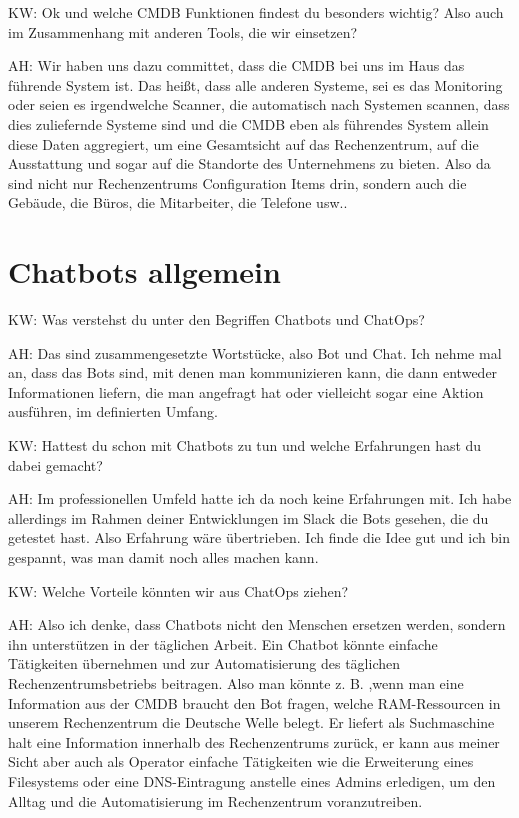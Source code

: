 \begin{list}{X:}{\setlength{\labelsep}{5mm}}
\item [KW:] Ok und welche CMDB Funktionen findest du besonders wichtig? Also auch im Zusammenhang mit anderen Tools, die wir einsetzen? 
\item [AH:] Wir haben uns dazu committet, dass die CMDB bei uns im Haus das führende System ist. Das heißt, dass alle anderen Systeme, sei es das Monitoring oder seien es irgendwelche Scanner, die automatisch nach Systemen scannen, dass dies zuliefernde Systeme sind und die CMDB eben als führendes System allein diese Daten aggregiert, um eine Gesamtsicht auf das Rechenzentrum, auf die Ausstattung und sogar auf die Standorte des Unternehmens zu bieten. Also da sind nicht nur Rechenzentrums Configuration Items drin, sondern auch die Gebäude, die Büros, die Mitarbeiter, die Telefone usw..
\end{list}

\section*{Chatbots allgemein}

\begin{list}{X:}{\setlength{\labelsep}{5mm}}
\item [KW:] Was verstehst du unter den Begriffen Chatbots und ChatOps?
\item [AH:] Das sind zusammengesetzte Wortstücke, also Bot und Chat. Ich nehme mal an, dass das Bots sind, mit denen man kommunizieren kann, die dann entweder Informationen liefern, die man angefragt hat oder vielleicht sogar eine Aktion ausführen, im definierten Umfang. 
\item [KW:] Hattest du schon mit Chatbots zu tun und welche Erfahrungen hast du dabei gemacht?
\item [AH:] Im professionellen Umfeld hatte ich da noch keine Erfahrungen mit. Ich habe allerdings im Rahmen deiner Entwicklungen im Slack die Bots gesehen, die du getestet hast. Also Erfahrung wäre übertrieben. Ich finde die Idee gut und ich bin gespannt, was man damit noch alles machen kann.
\item [KW:] Welche Vorteile könnten wir aus ChatOps ziehen?
\item [AH:] Also ich denke, dass Chatbots nicht den Menschen ersetzen werden, sondern ihn unterstützen in der täglichen Arbeit. Ein Chatbot könnte einfache Tätigkeiten übernehmen und zur Automatisierung des täglichen Rechenzentrumsbetriebs beitragen. Also man könnte z. B. ,wenn man eine Information aus der CMDB braucht den Bot fragen, welche RAM-Ressourcen in unserem Rechenzentrum die Deutsche Welle belegt. Er liefert als Suchmaschine halt eine Information innerhalb des Rechenzentrums zurück, er kann aus meiner Sicht aber auch als Operator einfache Tätigkeiten wie die Erweiterung eines Filesystems oder eine DNS-Eintragung anstelle eines Admins erledigen, um den Alltag und die Automatisierung im Rechenzentrum voranzutreiben.
\end{list}

